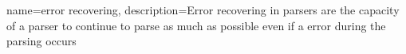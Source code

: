 {
    name=error recovering,
    description={Error recovering in parsers are the capacity of a parser to continue to parse as much as possible even if a error during the parsing occurs}
}

